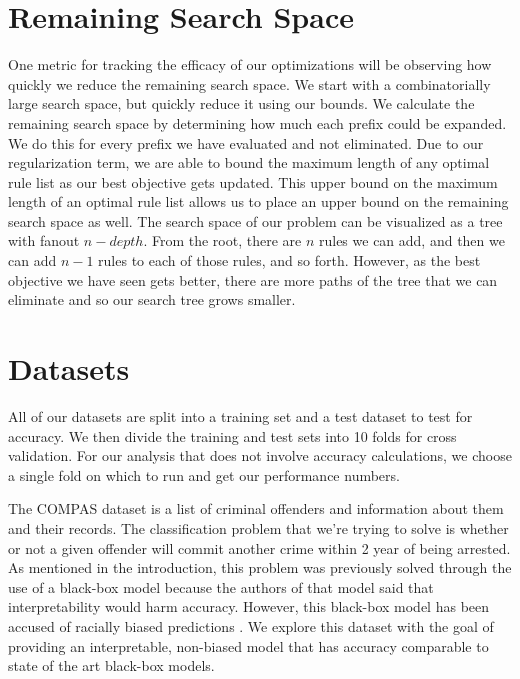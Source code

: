 \section{Remaining Search Space}
One metric for tracking the efficacy of our optimizations will be observing how quickly we reduce the remaining search space.
We start with a combinatorially large search space, but quickly reduce it using our bounds.
We calculate the remaining search space by determining how much each prefix could be expanded.
We do this for every prefix we have evaluated and not eliminated.
Due to our regularization term, we are able to bound the maximum length of any optimal rule list as our best objective gets updated.
This upper bound on the maximum length of an optimal rule list allows us to place an upper bound on the remaining search space as well.
The search space of our problem can be visualized as a tree with fanout $n - depth$.
From the root, there are $n$ rules we can add, and then we can add $n - 1$ rules to each of those rules, and so forth.
However, as the best objective we have seen gets better, there are more paths of the tree that we can eliminate and so our search tree grows smaller.

\section{Datasets}
\label{def:datasets}
All of our datasets are split into a training set and a test dataset to test for accuracy.
We then divide the training and test sets into 10 folds for cross validation.
For our analysis that does not involve accuracy calculations, we choose a single fold on which to run and get our performance numbers.

The COMPAS dataset is a list of criminal offenders and information about them and their records.
The classification problem that we're trying to solve is whether or not a given offender will commit another crime within 2 year of being arrested.
As mentioned in the introduction, this problem was previously solved through the use of a black-box model because the authors of that model said that interpretability would harm accuracy.
However, this black-box model has been accused of racially biased predictions \cite{LarsonMaKiAn16}.
We explore this dataset with the goal of providing an interpretable, non-biased model that has accuracy comparable to state of the art black-box models.

